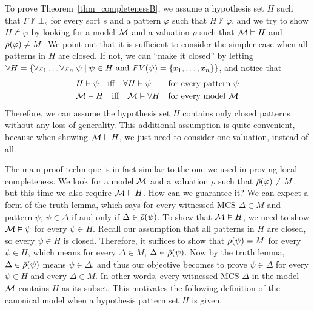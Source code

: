 \documentclass{amsart}
\begin{document}
To prove Theorem~\ref{thm_completenessB}, 
we assume a hypothesis set $H$ such that
$\Gamma \not\vdash \bot_s$ for every sort $s$
and a pattern $\varphi$ 
such that $H \not\vdash \varphi$, and we try to show
$H \not\vDash \varphi$
by looking for a model $\mathcal{M}$ and a valuation $\rho$ such that
$\mathcal{M} \vDash H$ and $\bar{\rho}(\varphi) \neq M$.
We point out that it is sufficient to
consider the simpler case when all patterns in $H$ are closed.
If not,
we can ``make it closed'' by letting
$\forall H = 
 \{ \forall x_1 \dots \forall x_n . \psi
    \mid \psi \in H 
    \text{ and } \mathit{FV}(\psi) = \{ x_1 ,\dots, x_n \}   \}$,
and notice that
\begin{align*}
& H \vdash \psi \quad\text{iff}\quad
  \forall H \vdash \psi
&& \text{for every pattern $\psi$}
\\
& \mathcal{M} \vDash H \quad\text{iff}\quad
  \mathcal{M} \vDash \forall H
&& \text{for every model $\mathcal{M}$}
\end{align*}
Therefore, 
we can assume
the hypothesis set $H$ contains only closed
patterns without any loss of generality.
This additional assumption is quite convenient,
because when showing $\mathcal{M} \vDash H$,
we just need to consider one valuation, instead of all.

The main proof technique is in fact similar
to the one we used in proving local completeness.
We look for a model $\mathcal{M}$ and a valuation $\rho$ such that
$\bar{\rho}(\varphi) \neq M$,
but this time we also require $\mathcal{M} \vDash H$.
How can we guarantee it?
We can expect a form of the truth lemma, which says
for every witnessed MCS $\Delta \in M$ and pattern $\psi$,
$\psi \in \Delta$ if and only if $\Delta \in \bar{\rho}(\psi)$.
To show that $\mathcal{M} \vDash H$, we need to show
$\mathcal{M} \vDash \psi$ for every $\psi \in H$.
Recall our assumption that all patterns in $H$ are closed,
so every $\psi \in H$ is closed.
Therefore, it suffices to show that
$\bar{\rho}(\psi) = M$
for every $\psi \in H$,
which means for every $\Delta \in M$, $\Delta \in \bar{\rho}(\psi)$.
Now by the truth lemma,
$\Delta \in \bar{\rho}(\psi)$ means
$\psi \in \Delta$, and thus our objective becomes to prove
$\psi \in \Delta$
for every $\psi \in H$ and every $\Delta \in M$.
In other words, every witnessed MCS $\Delta$ in the model $\mathcal{M}$
contains $H$ as its subset.
This motivates the following definition of the canonical model
when a hypothesis pattern set $H$ is given.
\end{document}

